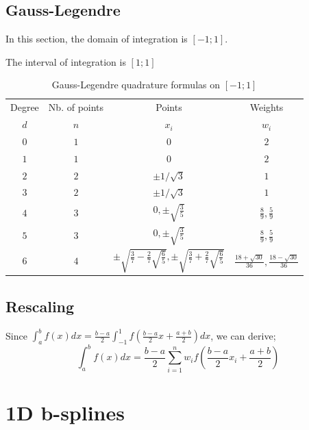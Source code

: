 \documentclass[paper=a4, fontsize=11pt]{book}
\numberwithin{equation}{section}		%
\numberwithin{figure}{section}			%
\numberwithin{table}{section}				%
\begin{document}
\subsection{Gauss-Legendre}

In this section, the domain of integration is $[-1;1]$.

\begin{table}[hbtp]
\caption{\label{Tab:11Form}Gauss-Legendre quadrature formulas on $[-1;1]$}
\centering
\scriptsize The interval of integration is $[1;1]$\\
\centering
\begin{tabular}{@{}cccc}
\hline
Degree & Nb. of points & Points & Weights\\
$d$ & $n$ & $x_i$ & $w_i$\\
\hline
$0$ & $1$ & $0$ & $2$ \\
$1$ & $1$ & $0$ & $2$ \\
$2$ & $2$ & $\pm 1/\sqrt{3}$ & $1$ \\
$3$ & $2$ & $\pm 1/\sqrt{3}$ & $1$ \\
$4$ & $3$ & $0, \pm \sqrt{\frac{3}{5}}$ & $\frac{8}{9}, \frac{5}{9}$ \\
$5$ & $3$ & $0, \pm \sqrt{\frac{3}{5}}$ & $\frac{8}{9}, \frac{5}{9}$ \\
$6$ & $4$ & $\pm \sqrt{\frac{3}{7} - \frac{2}{7}\sqrt{\frac{6}{5}}}, \pm \sqrt{\frac{3}{7} + \frac{2}{7}\sqrt{\frac{6}{5}}}$ & $\frac{18+\sqrt{30}}{36}, \frac{18-\sqrt{30}}{36}$ \\
\hline
\end{tabular}
\end{table}



\subsection{Rescaling}

Since $\int_a^b f(x)dx = \frac{b-a}{2}\int_{-1}^1 f\left(\frac{b-a}{2}x + \frac{a+b}{2}\right)dx$, we can derive;
$$
\int_a^b f(x)dx = \frac{b-a}{2}\sum_{i=1}^n w_if\left(\frac{b-a}{2}x_i + \frac{a+b}{2}\right)
$$




\newpage
\section{1D b-splines}
\end{document}

